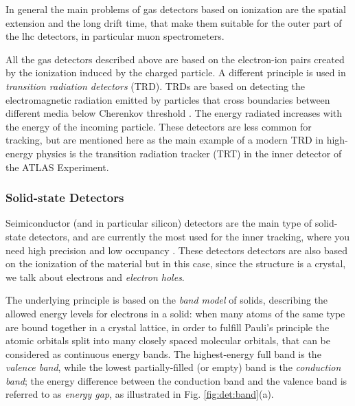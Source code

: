 In general the main problems of gas detectors based on ionization are the spatial extension and the long drift time, that make them suitable for the outer part of the \gls{lhc} detectors, in particular muon spectrometers.

All the gas detectors described above are based on the electron-ion pairs created by the ionization induced by the charged particle. A different principle is used in \textit{transition radiation detectors} (TRD). TRDs are based on detecting the electromagnetic radiation emitted by particles that cross boundaries between different media below Cherenkov threshold \cite{1402-4896-1982-T2A-024}. The energy radiated increases with the energy of the incoming particle. These detectors are less common for tracking, but are mentioned here as the main example of a modern TRD in high-energy physics is the transition radiation tracker (TRT) in the inner detector of the ATLAS Experiment.

\subsubsection*{Solid-state Detectors}

Seimiconductor (and in particular silicon) detectors are the main type of solid-state detectors, and are currently the most used for the inner tracking, where you need high precision and low occupancy \cite{Hartmann:2009zza}. These detectors detectors are also based on the ionization of the material but in this case, since the structure is a crystal, we talk about electrons and \textit{electron holes}. 

The underlying principle is based on the \textit{band model} of solids, describing the allowed energy levels for electrons in a solid: when many atoms of the same type are bound together in a crystal lattice, in order to fulfill Pauli's principle the atomic orbitals split into many closely spaced molecular orbitals, that can be considered as continuous energy bands. The highest-energy full band is the \textit{valence band}, while the lowest partially-filled (or empty) band is the \textit{conduction band}; the energy difference between the conduction band and the valence band is referred to as \textit{energy gap}, as illustrated in Fig. \ref{fig:det:band}(a). 

